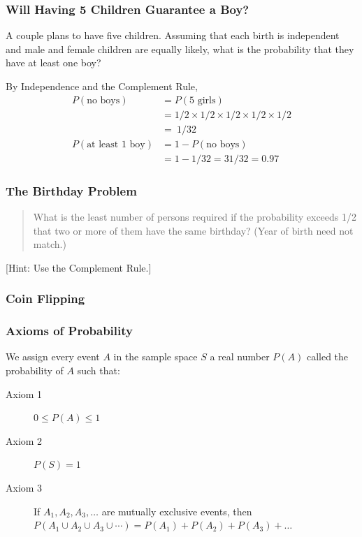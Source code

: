 \documentclass{beamer}
\begin{document}
\begin{frame}
\frametitle{Will Having 5 Children Guarantee a Boy? }
A couple plans to have five children. Assuming that each birth is independent and male and female children are equally likely, what is the probability that they have at least one boy?
\vspace{1em}

\pause
\alert{By Independence and the Complement Rule,}
	\begin{align*}
		P(\mbox{no boys})&= P(\mbox{5 girls})\\
							&= 1/2 \times 1/2 \times 1/2 \times 1/2 \times 1/2\\
							&=\ 1/32\\
		P(\mbox{at least 1 boy})&=1 - P(\mbox{no boys})\\
		&=1 - 1/32 =31/32 = 0.97
	\end{align*}

\end{frame}

\begin{frame}
\frametitle{The Birthday Problem}
	\begin{quote}
		What is the least number of persons required if the probability exceeds 1/2 that two or more of them have the same birthday? (Year of birth need not match.)
	\end{quote}
	
	\hfill \alert{[Hint: Use the Complement Rule.]}
\end{frame}

\begin{frame}
\frametitle{Coin Flipping}
\end{frame}


\begin{frame}
\frametitle{Axioms of Probability}
We assign every event $A$ in the sample space $S$ a real number $P(A)$ called the \alert{probability of $A$} such that: 
\vspace{1em}
\begin{description}
	\item[Axiom 1] $0 \leq P(A) \leq 1$
	\item[Axiom 2] $P(S)=1$
	\item[Axiom 3] If $A_1, A_2, A_3, \hdots$ are mutually exclusive events, then $P(A_1\cup A_2 \cup A_3 \cup \cdots) = P(A_1) + P(A_2) + P(A_3) + \hdots$
\end{description}

\end{frame}
\end{document}
